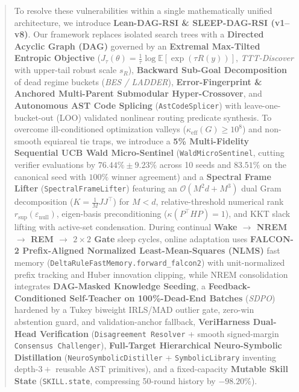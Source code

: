 \documentclass[11pt,a4paper]{article}
\begin{document}
\begin{abstract}
To resolve these vulnerabilities within a single mathematically unified architecture, we introduce \textbf{Lean-DAG-RSI \& SLEEP-DAG-RSI (v1--v8)}. Our framework replaces isolated search trees with a \textbf{Directed Acyclic Graph (DAG)} governed by an \textbf{Extremal Max-Tilted Entropic Objective} ($J_\tau(\theta) = \frac{1}{\tau}\log \mathbb{E}[\exp(\tau R(y))]$, \emph{TTT-Discover} with upper-tail robust scale $s_R$), \textbf{Backward Sub-Goal Decomposition} of dead regime buckets (\emph{BES / LADDER}), \textbf{Error-Fingerprint \& Anchored Multi-Parent Submodular Hyper-Crossover}, and \textbf{Autonomous AST Code Splicing} (\texttt{AstCodeSplicer}) with leave-one-bucket-out (LOO) validated nonlinear routing predicate synthesis. To overcome ill-conditioned optimization valleys ($\kappa_{\text{eff}}(G) \ge 10^8$) and non-smooth equiareal tie traps, we introduce a \textbf{5\% Multi-Fidelity Sequential UCB Wald Micro-Sentinel} (\texttt{WaldMicroSentinel}, cutting verifier evaluations by $\mathbf{76.44\% \pm 9.23\%}$ across 10 seeds and $\mathbf{83.51\%}$ on the canonical seed with $100\%$ winner agreement) and a \textbf{Spectral Frame Lifter} (\texttt{SpectralFrameLifter}) featuring an $\mathcal{O}(M^2 d + M^3)$ dual Gram decomposition ($K = \frac{1}{M}J J^\top$) for $M < d$, relative-threshold numerical rank $r_{\sup}(\varepsilon_{\text{null}})$, eigen-basis preconditioning ($\kappa(P^\top H P) = 1$), and KKT slack lifting with active-set condensation. During continual \textbf{Wake $\to$ NREM $\to$ REM $\to$ $2\times 2$ Gate} sleep cycles, online adaptation uses \textbf{FALCON-2 Prefix-Aligned Normalized Least-Mean-Squares (NLMS)} fast memory (\texttt{DeltaRuleFastMemory.forward\_falcon2}) with unit-normalized prefix tracking and Huber innovation clipping, while NREM consolidation integrates \textbf{DAG-Masked Knowledge Seeding}, a \textbf{Feedback-Conditioned Self-Teacher on 100\%-Dead-End Batches} (\emph{SDPO}) hardened by a Tukey biweight IRLS/MAD outlier gate, zero-win abstention guard, and validation-anchor fallback, \textbf{VeriHarness Dual-Head Verification} (\texttt{Disagreement Resolver} + smooth signed-margin \texttt{Consensus Challenger}), \textbf{Full-Target Hierarchical Neuro-Symbolic Distillation} (\texttt{NeuroSymbolicDistiller} + \texttt{SymbolicLibrary} inventing depth-$3+$ reusable AST primitives), and a fixed-capacity \textbf{Mutable Skill State} (\texttt{SKILL.state}, compressing 50-round history by $\mathbf{-98.20\%}$).


\end{abstract}
\end{document}
